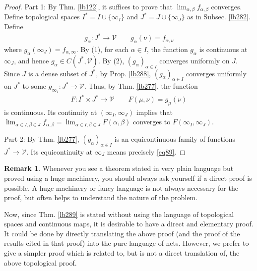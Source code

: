 \documentclass[12pt,b5paper,notitlepage]{article}
\theoremstyle{definition}
\newtheorem{rem}[df]{Remark}
\theoremstyle{plain}
\newcommand{\mc}{\mathcal}
\newcommand{\dps}{\displaystyle}
\numberwithin{equation}{section}
\begin{document}
\begin{proof}
Part 1: By Thm. \ref{lb122}, it suffices to prove that $\lim_{\alpha,\beta}f_{\alpha,\beta}$ converges. Define topological spaces $I^*=I\cup\{\infty_I\}$ and $J^*=J\cup\{\infty_J\}$ as in Subsec. \ref{lb282}. Define 
\begin{gather*}
g_\alpha:J^*\rightarrow\mc V\qquad g_\alpha(\nu)=f_{\alpha,\nu}
\end{gather*}
where $g_\alpha(\infty_J)=f_{\alpha,\infty}$. By (1), for each $\alpha\in I$, the function $g_\alpha$ is continuous at $\infty_J$, and hence $g_\alpha\in C(J^*,\mc V)$. By (2), $(g_\alpha)_{\alpha\in I}$ converges uniformly on $J$. Since $J$ is a dense subset of $J^*$, by Prop. \ref{lb288}, $(g_\alpha)_{\alpha\in I}$ converges uniformly on $J^*$ to some $g_{\infty_I}:J^*\rightarrow\mc V$. Thus, by Thm. \ref{lb277}, the function
\begin{align*}
F:I^*\times J^*\rightarrow\mc V\qquad F(\mu,\nu)=g_\mu(\nu)
\end{align*}
is continuous. Its continuity at $(\infty_I,\infty_J)$ implies that $\dps\lim_{\alpha\in I,\beta\in J}f_{\alpha,\beta}=\dps\lim_{\alpha\in I,\beta\in J} F(\alpha,\beta)$ converges to $F(\infty_I,\infty_J)$.

Part 2: By Thm. \ref{lb277}, $(g_\alpha)_{\alpha\in I}$ is an equicontinuous family of functions $J^*\rightarrow\mc V$. Its equicontinuity at $\infty_J$ means precisely \eqref{eq89}.
\end{proof}


\begin{rem}
Whenever you see a theorem stated in very plain language but proved using a huge machinery, you should always ask yourself if a direct proof is possible. A huge machinery or fancy language is not always necessary for the proof, but often helps to understand the nature of the problem.

Now, since Thm. \ref{lb289} is stated without using the language of topological spaces and continuous maps, it is desirable to have a direct and elementary proof. It could be done by directly translating the above proof (and the proof of the results cited in that proof) into the pure language of nets. However, we prefer to give a simpler proof which is related to, but is not a direct translation of, the above topological proof.   \hfill\qedsymbol
\end{rem}
\end{document}

